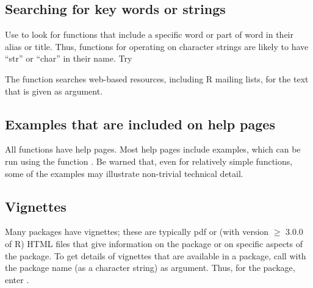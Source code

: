\subsection*{Searching for key words or strings}

Use  to look for functions that include a specific
word or part of word in their alias or title. Thus,
functions for operating on character strings are likely to have
``str'' or ``char'' in their name. Try
\begin{knitrout}
\color{fgcolor}\begin{kframe}
\begin{alltt}
\hlstd{(}\hlstd{,} \hlstd{=}\hlstd{)}
\hlstd{(}\hlstd{,} \hlstd{=}\hlstd{)}
\end{alltt}
\end{kframe}
\end{knitrout}

The function  searches web-based resources, including
R mailing lists, for the text that is given as argument.

\subsection*{Examples that are included on help pages}

All functions have help pages.  Most help pages include examples, which can be
run using the function .  Be warned that, even for
relatively simple functions, some of the examples may illustrate
non-trivial technical detail.

\subsection*{Vignettes}

  Many packages
have vignettes; these are typically pdf or (with version $\ge$ 3.0.0
of R) HTML files that give information on the package or on specific
aspects of the package. To get details of vignettes that are available
in a package, call  with the package name (as
a character string) as argument.  Thus, for the 
package, enter .

